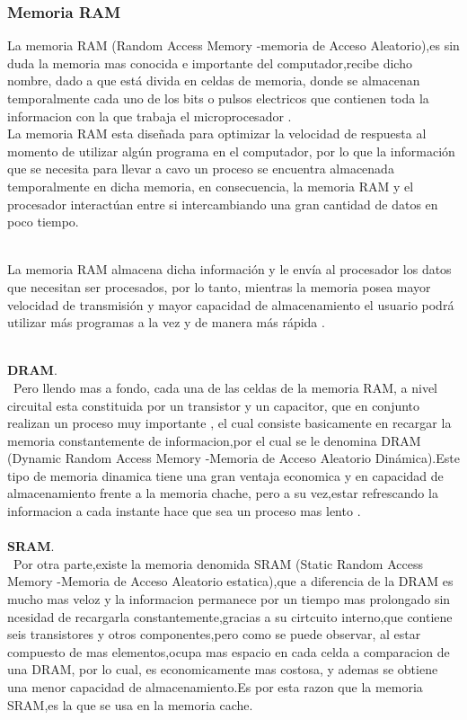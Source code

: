 \documentclass{article}
\begin{document}
\subsubsection{Memoria RAM}
La memoria RAM (Random Access Memory -memoria de Acceso Aleatorio),es sin duda la memoria mas conocida e importante del computador,recibe dicho nombre, dado a  que está divida en celdas de memoria, donde se almacenan temporalmente cada uno de los bits o pulsos electricos que contienen toda la informacion con la que trabaja el microprocesador \cite{augusto}.\\

La memoria RAM esta diseñada para optimizar la velocidad de respuesta al momento de utilizar algún
programa en el computador, por lo que  la información que se  necesita para llevar a cavo un proceso  se encuentra almacenada temporalmente en dicha memoria,  en consecuencia, la memoria RAM y el procesador interactúan entre si intercambiando una gran cantidad de datos en poco tiempo.\\\

La memoria RAM almacena dicha información y le envía al procesador los datos que necesitan
ser procesados, por lo tanto, mientras la memoria posea mayor velocidad de transmisión y
mayor capacidad de almacenamiento el usuario podrá utilizar más programas a la vez y de
manera más rápida \cite{apuntes}.\\\

\textbf{DRAM}.\\\
Pero llendo mas a fondo, cada una de las celdas de la memoria RAM, a nivel circuital esta constituida por un transistor y un capacitor, que en conjunto realizan un proceso muy importante , el cual consiste basicamente en recargar la memoria constantemente de informacion,por el cual se le denomina DRAM (Dynamic Random Access Memory -Memoria de Acceso Aleatorio Dinámica).Este tipo de memoria dinamica tiene una gran ventaja economica y en capacidad de almacenamiento frente a la memoria chache, pero a su vez,estar refrescando la informacion a cada instante hace que sea un proceso mas  lento \cite{augusto}.\\\\

\textbf{SRAM}.\\\
Por otra parte,existe la memoria denomida SRAM (Static Random Access Memory -Memoria de Acceso Aleatorio estatica),que a diferencia de la DRAM es mucho mas veloz y la informacion permanece por un tiempo mas prolongado sin ncesidad de recargarla constantemente,gracias a su cirtcuito interno,que contiene seis transistores y otros componentes,pero como se puede observar, al estar compuesto de mas elementos,ocupa mas espacio en cada celda a comparacion de una DRAM, por lo cual, es economicamente mas costosa, y ademas se obtiene una menor capacidad de almacenamiento.Es por esta razon que la memoria SRAM,es la que se usa en la memoria cache.
\end{document}
